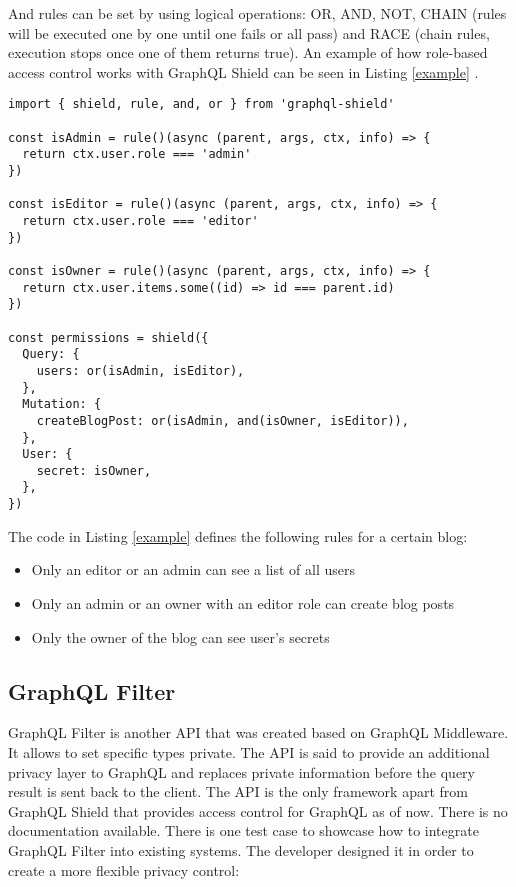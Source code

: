 \documentclass[conference]{IEEEtran}
\begin{document}
And rules can be set by using logical operations: OR, AND, NOT, CHAIN (rules will be executed one by one until one fails or all pass) and RACE (chain rules, execution stops once one of them returns true). An example of how role-based access control works with GraphQL Shield can be seen in Listing \ref{example} .

\label{example}
\begin{lstlisting}[label=example,caption=Role-based Access Control \cite{b1}]
import { shield, rule, and, or } from 'graphql-shield'

const isAdmin = rule()(async (parent, args, ctx, info) => {
  return ctx.user.role === 'admin'
})

const isEditor = rule()(async (parent, args, ctx, info) => {
  return ctx.user.role === 'editor'
})

const isOwner = rule()(async (parent, args, ctx, info) => {
  return ctx.user.items.some((id) => id === parent.id)
})

const permissions = shield({
  Query: {
    users: or(isAdmin, isEditor),
  },
  Mutation: {
    createBlogPost: or(isAdmin, and(isOwner, isEditor)),
  },
  User: {
    secret: isOwner,
  },
})
\end{lstlisting}

The code in Listing \ref{example} defines the following rules for a certain blog:

\begin{itemize}
    \item Only an editor or an admin can see a list of all users
    \item Only an admin or an owner with an editor role can create blog posts
    \item Only the owner of the blog can see user's secrets
\end{itemize}


\subsection{GraphQL Filter}\label{filter}

GraphQL Filter is another API that was created based on GraphQL Middleware. It allows to set specific types private. The API is said to provide an additional privacy layer to GraphQL and replaces private information before the query result is sent back to the client. The API is the only framework apart from GraphQL Shield that provides access control for GraphQL as of now. There is no documentation available. There is one test case to showcase how to integrate GraphQL Filter into existing systems. The developer designed it in order to create a more flexible privacy control:\newline
\end{document}
